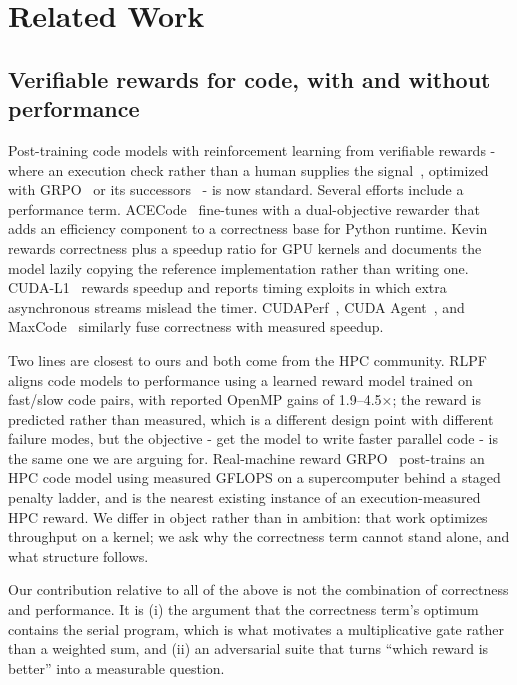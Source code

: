 \section{Related Work}
\label{sec:related}

\subsection{Verifiable rewards for code, with and without performance}

Post-training code models with reinforcement learning from verifiable
rewards - where an execution check rather than a human supplies the
signal~\cite{tulu3,deepseekr1}, optimized with GRPO~\cite{grpo} or its
successors~\cite{dapo,drgrpo,gspo} - is now standard. Several efforts include
a performance term. ACECode~\cite{acecode} fine-tunes with a dual-objective
rewarder that adds an efficiency component to a correctness base for Python
runtime. Kevin~\cite{kevin} rewards correctness plus a speedup ratio for GPU
kernels and documents the model lazily copying the reference implementation
rather than writing one. CUDA-L1~\cite{cudal1} rewards speedup and reports
timing exploits in which extra asynchronous streams mislead the timer.
CUDAPerf~\cite{cudaperf}, CUDA Agent~\cite{cudaagent}, and
MaxCode~\cite{maxcode} similarly fuse correctness with measured speedup.

Two lines are closest to ours and both come from the HPC community.
RLPF~\cite{rlpf} aligns code models to performance using a learned reward model
trained on fast/slow code pairs, with reported OpenMP gains of
1.9--4.5$\times$; the reward is predicted rather than measured, which is a
different design point with different failure modes, but the objective - get
the model to write faster parallel code - is the same one we are arguing for.
Real-machine reward GRPO~\cite{realmachine} post-trains an HPC code model using
measured GFLOPS on a supercomputer behind a staged penalty ladder, and is the
nearest existing instance of an execution-measured HPC reward. We differ in
object rather than in ambition: that work optimizes throughput on a kernel; we
ask why the correctness term cannot stand alone, and what structure follows.

Our contribution relative to all of the above is not the combination of
correctness and performance. It is (i) the argument that the correctness term's
optimum contains the serial program, which is what motivates a multiplicative
gate rather than a weighted sum, and (ii) an adversarial suite that turns
``which reward is better'' into a measurable question.

